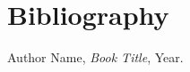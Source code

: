 \chapter*{Bibliography}
\begin{thebibliography}{9}
     Author Name, \textit{Book Title}, Year.
\end{thebibliography}

